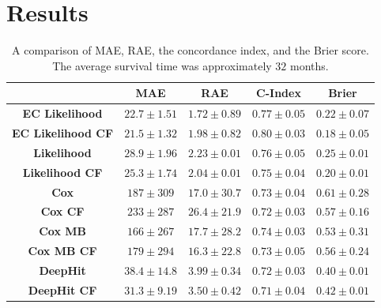     \section{Results} \label{sec:deep_learning_for_ct_based_survival_analysis_of_idiopathic_pulmonary_fibrosis_patients_appendix_results}
        \begin{table}
            \centering
            
            \captionsetup{singlelinecheck=false, justification=centering}
            \caption{
                A comparison of \gls{MAE}, \gls{RAE}, the concordance index, and the Brier score. The average survival time was approximately $32$ months.
            }
            
            \resizebox*{1.0\linewidth}{!}
            {
                \begin{tabular}{||c|cc|c|c||}
                    \hline
                                                            & \textbf{\gls{MAE}} & \textbf{\gls{RAE}} & \textbf{C-Index}  & \textbf{Brier}    \\
                    \hline
                    \textbf{\gls{EC} Likelihood}            & $22.7\pm1.51$      & $1.72\pm0.89$      & $0.77\pm0.05$     & $0.22\pm0.07$      \\
                    \textbf{\gls{EC} Likelihood \gls{CF}}   & $21.5\pm1.32$      & $1.98\pm0.82$      & $0.80\pm0.03$     & $0.18\pm0.05$      \\
                    \textbf{Likelihood}                    & $28.9\pm1.96$      & $2.23\pm0.01$      & $0.76\pm0.05$     & $0.25\pm0.01$      \\
                    \textbf{Likelihood \gls{CF}}           & $25.3\pm1.74$      & $2.04\pm0.01$      & $0.75\pm0.04$     & $0.20\pm0.01$      \\
                    \hline
                    \textbf{Cox}                           & $187 \pm309 $      & $17.0\pm30.7$      & $0.73\pm0.04$     & $0.61\pm0.28$      \\
                    \textbf{Cox \gls{CF}}                  & $233 \pm287 $      & $26.4\pm21.9$      & $0.72\pm0.03$     & $0.57\pm0.16$      \\
                    \textbf{Cox \gls{MB}}                  & $166 \pm267 $      & $17.7\pm28.2$      & $0.74\pm0.03$     & $0.53\pm0.31$      \\
                    \textbf{Cox \gls{MB} \gls{CF}}         & $179 \pm294 $      & $16.3\pm22.8$      & $0.73\pm0.05$     & $0.56\pm0.24$      \\
                    \hline
                    \textbf{DeepHit}                       & $38.4\pm14.8$      & $3.99\pm0.34$      & $0.72\pm0.03$     & $0.40\pm0.01$      \\
                    \textbf{DeepHit \gls{CF}}              & $31.3\pm9.19$      & $3.50\pm0.42$      & $0.71\pm0.04$     & $0.42\pm0.01$      \\
                    \hline
                \end{tabular}
            }
            \label{tab:deep_learning_for_ct_based_survival_analysis_of_idiopathic_pulmonary_fibrosis_patients_appendix_results_table}
        \end{table}
    
